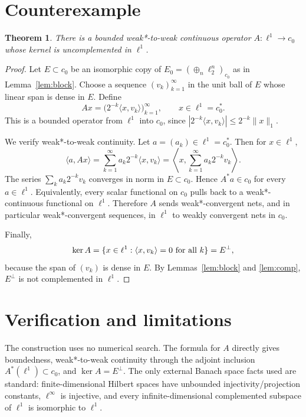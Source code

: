 \documentclass[11pt]{article}
\newtheorem{theorem}{Theorem}
\newcommand{\ellone}{\ell^1}
\newcommand{\Hn}{\ell_2^n}
\newcommand{\ellinf}{\ell^\infty}
\newcommand{\cnull}{c_0}
\begin{document}
\section*{Counterexample}

\begin{theorem}\label{thm:counterexample}
There is a bounded weak*-to-weak continuous operator $A:\ellone\to \cnull$ whose
kernel is uncomplemented in $\ellone$.
\end{theorem}

\begin{proof}
Let $E\subset \cnull$ be an isomorphic copy of
$E_0=(\oplus_n \Hn)_{\cnull}$ as in Lemma~\ref{lem:block}.  Choose a
sequence $(v_k)_{k=1}^\infty$ in the unit ball of $E$ whose linear span is dense
in $E$.  Define
\[
        A x=\big(2^{-k}\langle x,v_k\rangle\big)_{k=1}^\infty,
        \qquad x\in \ellone=\cnull^* .
\]
This is a bounded operator from $\ellone$ into $\cnull$, since
$|2^{-k}\langle x,v_k\rangle|\leq 2^{-k}\|x\|_1$.

We verify weak*-to-weak continuity.  Let $a=(a_k)\in \ellone=\cnull^*$.  Then
for $x\in\ellone$,
\[
        \langle a,Ax\rangle
        =\sum_{k=1}^\infty a_k2^{-k}\langle x,v_k\rangle
        =\left\langle x,\sum_{k=1}^\infty a_k2^{-k}v_k\right\rangle .
\]
The series $\sum_k a_k2^{-k}v_k$ converges in norm in $E\subset\cnull$.  Hence
$A^*a\in\cnull$ for every $a\in\ellone$.  Equivalently, every scalar functional
on $\cnull$ pulls back to a weak*-continuous functional on $\ellone$.  Therefore
$A$ sends weak*-convergent nets, and in particular weak*-convergent sequences,
in $\ellone$ to weakly convergent nets in $\cnull$.

Finally,
\[
        \ker A
        =\{x\in\ellone:\langle x,v_k\rangle=0\hbox{ for all }k\}
        =E^\perp,
\]
because the span of $(v_k)$ is dense in $E$.  By Lemmas~\ref{lem:block} and
\ref{lem:comp}, $E^\perp$ is not complemented in $\ellone$.
\end{proof}

\section*{Verification and limitations}

The construction uses no numerical search.  The formula for $A$ directly gives
boundedness, weak*-to-weak continuity through the adjoint inclusion
$A^*(\ellone)\subset \cnull$, and $\ker A=E^\perp$.  The only external Banach
space facts used are standard: finite-dimensional Hilbert spaces have
unbounded injectivity/projection constants, $\ellinf$ is injective, and every
infinite-dimensional complemented subspace of $\ellone$ is isomorphic to
$\ellone$.
\end{document}
